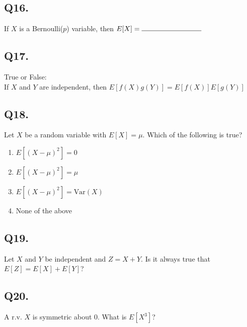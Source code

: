 \subsection*{Q16.}
If $X$ is a Bernoulli($p$) variable, then $E[X] = \rule{3cm}{0.15mm}$

\subsection*{Q17.}
True or False:\\ If $X$ and $Y$ are independent, then $E[f(X)g(Y)] = E[f(X)]E[g(Y)]$

\subsection*{Q18.}
Let $X$ be a random variable with $E[X] = \mu$. Which of the following is true?

\begin{enumerate}[label=(\alph*)]
    \item $E[(X - \mu)^2] = 0$
    \item $E[(X - \mu)^2] = \mu$
    \item $E[(X - \mu)^2] = \text{Var}(X)$
    \item None of the above
\end{enumerate}

\subsection*{Q19.}
Let $X$ and $Y$ be independent and $Z = X + Y$. Is it always true that $E[Z] = E[X] + E[Y]$?

\subsection*{Q20.}
A r.v. $X$ is symmetric about $0$. What is $E[X^3]$?


